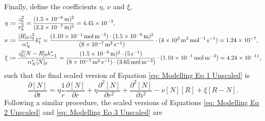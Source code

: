 \documentclass{article}
\begin{document}
Finally, define the coefficients $\eta$, $\nu$ and $\xi$, 
\begin{align*}
    \eta &:= \frac{z_0^2}{r_0^2} = \frac{(\SI{1.5d-8}{\meter})^2}{(\SI{2.2d-7}{\meter})^2} = \SI{4.45d-3}{}, \\
    \nu &:= \frac{[R]_0 z_0^2}{\alpha_N^*} k_1^* = \frac{(\SI{1.10d-1}{\mol\per\cubic\meter})\cdot(\SI{1.5d-8}{\meter})^2}{(\SI{8d-7}{\square\meter\per\second})}\cdot (\SI{4d3}{\cubic\meter\per\mol\per\second}) = \SI{1.24d-7}{}, \\
    \xi &:= \frac{ z_0^2 [N-R]_0 k_{-1}^*}{\alpha_N^* [N]_0} =  \frac{(\SI{1.5d-8}{\meter})^2\cdot(\SI{5}{\per\second})}{(\SI{8d-7}{\square\meter\per\second})\cdot (\SI{3.65}{\mol\per\cubic\meter})}\cdot(\SI{1.10d-1}{\mol\per\cubic\meter})  = \SI{4.24d-11}{},
\end{align*}
such that the final scaled version of Equation \eqref{eq: Modelling Eq 1 Unscaled} is
\begin{equation}
    \frac{\partial [N]}{\partial t} = 
    \eta \frac{1}{r} \frac{\partial [N]}{\partial r} +\eta  \frac{\partial^2 [N]}{\partial r^2}  +  \frac{\partial^2 [N]}{\partial z^2} -  \nu [N] [R] +  \xi [R-N].
    \label{skalert_sylinder2}
\end{equation}
Following a similar procedure, the scaled versions of Equations \eqref{eq: Modelling Eq 2  Unscaled} and \eqref{eq: Modelling Eq 3 Unscaled} are %
\end{document}
